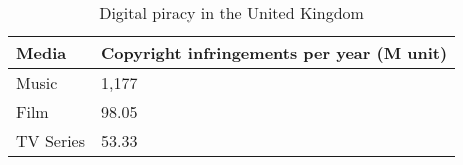 \begin{table}[h]
\centering
\begin{tabular}{ll}
Media     & Copyright infringements per year (M unit) \\ \hline
Music     & 1,177                                \\
Film      & 98.05                                \\
TV Series & 53.33                               
\end{tabular}

\caption{Digital piracy in the United Kingdom \citep{tera2010}}
\label{table:infringementsperyear}
\end{table}